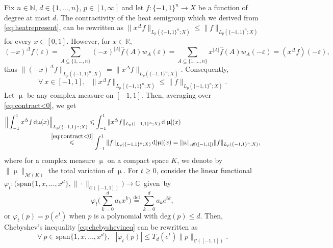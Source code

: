 \documentclass[11pt,reqno]{amsart}
\renewcommand{\leq}{\leqslant}
\renewcommand{\geq}{\geqslant}
\newcommand{\e}{\varepsilon}
\newcommand{\R}{\mathbb R}
\newcommand{\1}{\mathbf 1}
\theoremstyle{remark}
\newcommand{\C}{\mathbb C}
\newcommand{\N}{\mathbb N}
\newcommand{\eqdef}{\stackrel{\mathrm{def}}{=}}
\renewcommand{\mu}{\upmu}
\newcommand*\diff{\mathop{}\!\mathrm{d}}
\newcommand{\ms}{\mathscr}
\begin{document}
\medskip

Fix $n\in\N$, $d\in\{1,\ldots,n\}$, $p\in[1,\infty]$ and let $f:\{-1,1\}^n\to X$ be a function of degree at most $d$. The contractivity of the heat semigroup which we derived from \eqref{eq:heatrepresent}, can be rewritten as $\|x^\Delta f\|_{L_p(\{-1,1\}^n;X)} \leq \|f\|_{L_p(\{-1,1\}^n;X)}$ for every $x\in[0,1]$. However, for $x\in\R$,
\begin{equation} \label{eq:symmetrysemigroup}
(-x)^\Delta f(\e) = \sum_{A\subseteq\{1,\ldots,n\}} (-x)^{|A|} \widehat{f}(A) w_A(\e) =  \sum_{A\subseteq\{1,\ldots,n\}} x^{|A|} \widehat{f}(A) w_A(-\e) = (x^\Delta f)(-\e),
\end{equation}
thus $\|(-x)^\Delta f\|_{L_p(\{-1,1\}^n;X)} = \|x^\Delta f\|_{L_p(\{-1,1\}^n;X)}$. Consequently,
\begin{equation} \label{eq:contract<0}
\forall \ x\in[-1,1], \ \ \ \|x^\Delta f\|_{L_p(\{-1,1\}^n;X)}\leq \|f\|_{L_p(\{-1,1\}^n;X)}.
\end{equation}
Let $\mu$ be any complex measure on $[-1,1]$. Then, averaging over \eqref{eq:contract<0}, we get
\begin{equation} \label{eq:usetriangleformeasure}
\begin{split}
\Big\| \int_{-1}^1 x^\Delta f \diff\mu(x)&\Big\|_{L_p(\{-1,1\}^n;X)} \leq \int_{-1}^1 \|x^\Delta f\|_{L_p(\{-1,1\}^n;X)} \diff|\mu|(x)
\\ & \stackrel{\eqref{eq:contract<0}}{\leq} \int_{-1}^1 \|f\|_{L_p(\{-1,1\}^n;X)} \diff|\mu|(x) = \|\mu\|_{\ms{M}([-1,1])} \|f\|_{L_p(\{-1,1\}^n;X)},
\end{split}
\end{equation}
where for a complex measure $\mu$ on a compact space $K$, we denote by $\|\mu\|_{\ms{M}(K)}$ the total variation of $\mu$. For $t\geq0$, consider the linear \mbox{functional $\varphi_t: \big( \mathrm{span}\{1,x,\ldots,x^d\}, \|\cdot\|_{\ms{C}([-1,1])}\big) \to \C$ given by}
\begin{equation}
\varphi_t\Big(\sum_{k=0}^d a_k x^k\Big) \eqdef \sum_{k=0}^d a_ke^{tk},
\end{equation}
or $\varphi_t(p) = p(e^t)$ when $p$ is a polynomial with $\mathrm{deg}(p)\leq d$. Then, Chebyshev's inequality \eqref{eq:chebyshevineq} can be rewritten as
\begin{equation} \label{cheche}
\forall \ p\in\mathrm{span}\{1,x,\ldots,x^d\}, \ \ \ |\varphi_t(p)| \leq T_d(e^t) \|p\|_{\ms{C}([-1,1])}.
\end{equation}
\end{document}
